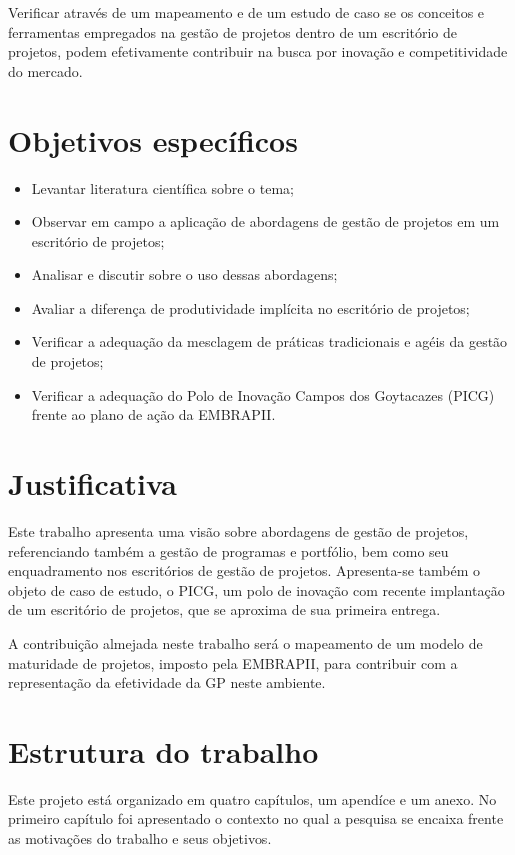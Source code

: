 Verificar através de um mapeamento e de um estudo de caso se os conceitos e ferramentas empregados na gestão de projetos dentro de um escritório de projetos, podem efetivamente contribuir na busca por inovação e competitividade do mercado.


\section{Objetivos específicos}

\begin{itemize}
  \item{Levantar literatura científica sobre o tema;}
  \item{Observar em campo a aplicação de abordagens de gestão de projetos em um escritório de projetos;}
  \item{Analisar e discutir sobre o uso dessas abordagens;}
  \item{Avaliar a diferença de produtividade implícita no escritório de projetos;}
  \item{Verificar a adequação da mesclagem de práticas tradicionais e agéis da gestão de projetos;}
  \item{Verificar a adequação do Polo de Inovação Campos dos Goytacazes (PICG) frente ao plano de ação da EMBRAPII.}
\end{itemize}


\section{Justificativa}

Este trabalho apresenta uma visão sobre abordagens de gestão de projetos, referenciando também a gestão de programas e portfólio, bem como seu enquadramento nos escritórios de gestão de projetos. Apresenta-se também o objeto de caso de estudo, o PICG, um polo de inovação com recente implantação de um escritório de projetos, que se aproxima de sua primeira entrega.

A contribuição almejada neste trabalho será o mapeamento de um modelo de maturidade de projetos, imposto pela EMBRAPII, para contribuir com a representação da efetividade da GP neste ambiente.

\section{Estrutura do trabalho}

Este projeto está organizado em quatro capítulos, um apendíce e um anexo. No primeiro capítulo foi apresentado o contexto no qual a pesquisa se encaixa frente as motivações do trabalho e seus objetivos.

